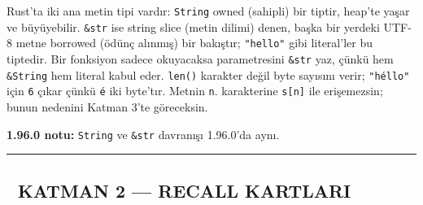\documentclass[12pt,a4paper]{article}
\begin{document}
Rust'ta iki ana metin tipi vardır: \texttt{String} owned (sahipli) bir tiptir, heap'te yaşar ve büyüyebilir. \texttt{\&str} ise string slice (metin dilimi) denen, başka bir yerdeki UTF-8 metne borrowed (ödünç alınmış) bir bakıştır; \texttt{"hello"} gibi literal'ler bu tiptedir. Bir fonksiyon sadece okuyacaksa parametresini \texttt{\&str} yaz, çünkü hem \texttt{\&String} hem literal kabul eder. \texttt{len()} karakter değil byte sayısını verir; \texttt{"héllo"} için \texttt{6} çıkar çünkü \texttt{é} iki byte'tır. Metnin \texttt{n}. karakterine \texttt{s{[}n{]}} ile erişemezsin; bunun nedenini Katman 3'te göreceksin.

\textbf{1.96.0 notu:} \texttt{String} ve \texttt{\&str} davranışı 1.96.0'da aynı.

\begin{center}\rule{0.5\linewidth}{0.5pt}\end{center}

\subsection{🔵 KATMAN 2 --- RECALL KARTLARI}\label{katman-2-—-recall-kartlari-5}
\end{document}
